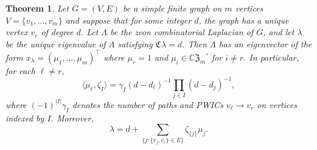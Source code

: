 \documentclass{article}
\newtheorem{theorem}{Theorem}[section]
\theoremstyle{definition}
\newcommand{\zco}{\mathfrak{C}\mspace{1mu}}
\newcommand{\CZ}{\mathbb{C}\mathfrak{Z}}
\numberwithin{equation}{section}
\begin{document}
\begin{theorem}\label{Laplacian eigenvector}
Let $G=(V,E)$ be a simple finite graph on $m$ vertices $V=\{v_1, \ldots, v_m\}$ and suppose that for some integer $d$, the graph has a unique vertex $v_r$ of degree $d$.  Let $\Lambda$ be the zeon combinatorial Laplacian of $G$, and let $\lambda$ be the unique eigenvalue of $\Lambda$ satisfying $\zco \lambda=d$.  Then
$\Lambda$ has an eigenvector of the form $x_\lambda=(\mu_1, \ldots,  \mu_{m})^\intercal$ where $\mu_r=1$ and $\mu_i\in{\CZ_m}^\circ$ for $i\ne r$.  In particular, for each $\ell\ne r$, \begin{equation}\label{eigenvector characterization 1}
\langle\mu_\ell, \zeta_I\rangle=\gamma_I(d-d_\ell)^{-1}\prod_{j\in I}(d-d_j)^{-1},
\end{equation}
where $(-1)^{|I|}\gamma_I$ denotes the number of paths and PWICs $v_\ell\to v_r$ on vertices indexed by $I$.   Moreover, \begin{equation*}
\lambda=d+\sum_{\{j: \{v_j,v_r\}\in E\}}\zeta_{\{j\}}\mu_j.
\end{equation*}
\end{theorem}
\end{document}

